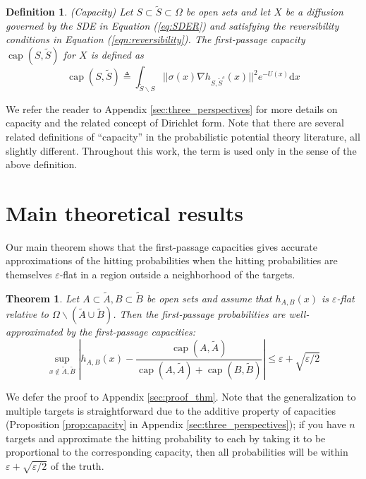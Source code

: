 \documentclass[12pt, nofootinbib,english, amsmath, amssymb, aps, priprint, graphicx,floatfix]{revtex4-1}
\newtheorem{definition}{Definition}
\newtheorem{theorem}{Theorem}
\theoremstyle{plain}
\theoremstyle{definition}
\theoremstyle{plain}
\newcommand{\capac}[2]{\ensuremath{\operatorname{cap}}(#1,#2)}
\begin{document}
\begin{definition}(Capacity)
Let $S \subset \tilde{S} \subset \Omega$ be open sets and let $X$ be a diffusion governed by the SDE in Equation (\ref{eq:SDER}) and satisfying the reversibility conditions in Equation (\ref{eqn:reversibility}).  The first-passage capacity $\ensuremath{\operatorname{cap}} (S, \tilde{S})$ for $X$ is defined as 
%
\[ \ensuremath{\operatorname{cap}} (S, \tilde{S}) \triangleq \int_{\tilde S \backslash S}
||\sigma(x) \nabla h_{S, \tilde{S}^c}(x)||^2 e^{- U(x)} \mathrm{d} x \]
%  
\end{definition}

We refer the reader to Appendix \ref{sec:three_perspectives} for more details on capacity and the related concept of Dirichlet form.  Note that there are several related definitions of ``capacity'' in the probabilistic potential theory literature, all slightly different.  Throughout this work, the term is used only in the sense of the above definition. 

\section{Main theoretical results}
\label{sec:MainResults}

Our main theorem shows that the first-passage capacities gives accurate approximations of the hitting probabilities when the hitting probabilities are themselves $\varepsilon$-flat in a region outside a neighborhood of the targets.

\begin{theorem}\label{thm:main_thm}  
Let $A\subset \tilde A,B\subset \tilde B$ be open sets and assume that  $h_{A,B}(x)$ is $\varepsilon$-flat relative to 
$\Omega \backslash (\tilde A \cup \tilde B)$.
Then the first-passage probabilities are well-approximated by the first-passage capacities:
\[ \sup_{x \notin \tilde A,\tilde B} \left| h_{A,B} (x) - \frac{\capac{A}{\tilde A}}{\capac{A}{\tilde A}+\capac{B}{\tilde B}} \right| \leqslant \varepsilon + \sqrt{\varepsilon/2} \]
\end{theorem}

We defer the proof to Appendix \ref{sec:proof_thm}.  Note that the generalization to multiple targets is straightforward due to the additive property of capacities (Proposition \ref{prop:capacity} in Appendix \ref{sec:three_perspectives}); if you have $n$ targets and approximate the hitting probability to each by taking it to be proportional to the corresponding capacity, then all probabilities will be within $\varepsilon+\sqrt{\varepsilon/2}$ of the truth.
\end{document}
